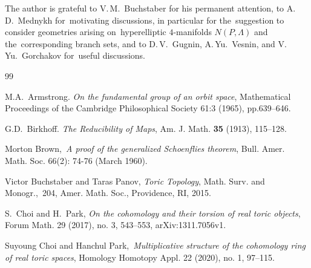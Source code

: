 \documentclass[12pt]{amsart}
\theoremstyle{definition}
\theoremstyle{remark}
\begin{document}
The author is grateful to V.\,M.~Buchstaber for his permanent attention, to A.\,D.~Mednykh 
for~motivating discussions, in particular for the~suggestion 
to consider geometries arising on~hyperelliptic $4$-manifolds $N(P,\Lambda)$ and the~corresponding branch sets,
and to D.\,V.~Gugnin, A.\,Yu.~Vesnin, and V.\,Yu.~Gorchakov for~useful discussions.

\begin{thebibliography}{99}
 
M.A.~Armstrong.
\emph{On the fundamental group of an orbit space},
Mathematical Proceedings of the Cambridge Philosophical Society 61:3 (1965), pp.639--646.

G.D.~Birkhoff.  
\emph{The Reducibility of Maps},
Am. J. Math. {\bf 35} (1913), 115--128.

Morton Brown,\,
\emph{A proof of the generalized Schoenflies theorem},
Bull. Amer. Math. Soc. 66(2): 74-76 (March 1960).

Victor Buchstaber and  Taras Panov,
\emph{Toric Topology},
Math. Surv. and Monogr.,~204, Amer. Math. Soc., Providence, RI, 2015.


S.~Choi and H.~Park, 
\emph{On the cohomology and their torsion of real toric objects},
Forum Math. 29 (2017), no. 3, 543--553, arXiv:1311.7056v1.

Suyoung Choi and Hanchul Park,\, 
\emph{Multiplicative structure of the cohomology ring of real toric spaces}, 
Homology Homotopy Appl. 22 (2020), no. 1, 97--115.





\end{thebibliography}
\end{document}
